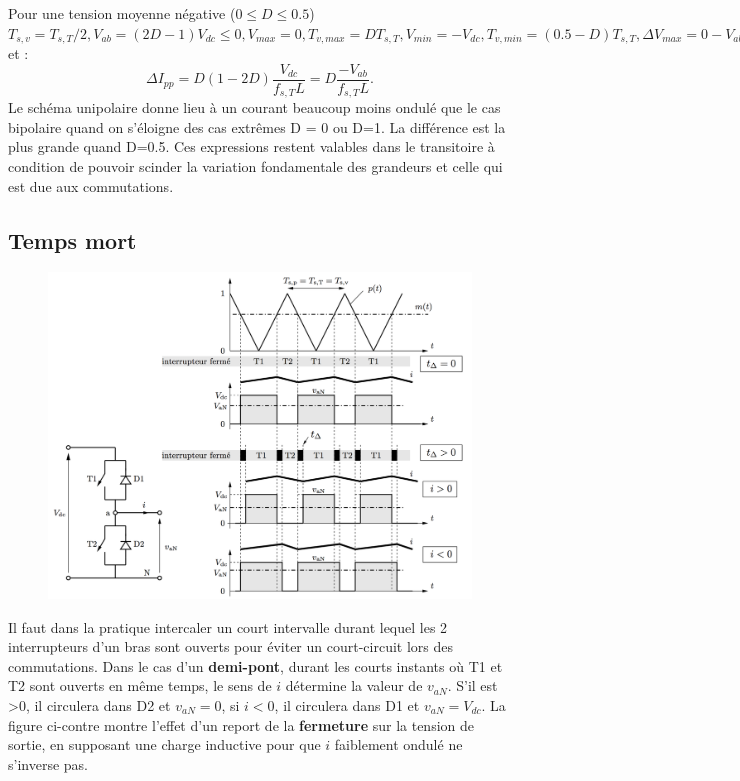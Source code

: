 		Pour une tension moyenne négative ($0\leq D\leq 0.5$) $T_{s,v} = T_{s,T}/2, V_{ab} =(2D-1)V_{dc}\leq 0, V_{max}=0, T_{v,max}=DT_{s,T}, V_{min}=-V_{dc}, T_{v,min}= (0.5-D)T_{s,T}, \Delta V_{max}= 0-V_{ab}=(1-2D)V_{dc}$ et :
		\begin{equation}
			\Delta I_{pp} = D(1-2D)\frac{V_{dc}}{f_{s,T}L} = D\frac{-V_{ab}}{f_{s,T}L}.
		\end{equation}
		Le schéma unipolaire donne lieu à un courant beaucoup moins ondulé que le cas bipolaire quand on s'éloigne des cas extrêmes D = 0 ou D=1. La différence est la plus grande quand D=0.5. Ces expressions restent valables dans le transitoire à condition de pouvoir scinder la variation fondamentale des grandeurs et celle qui est due aux commutations.
		
	\subsection{Temps mort}
		\begin{figure}
		\vspace{-5mm}
		\includegraphics[scale=0.2]{ch4/15}
		\end{figure}
		Il faut dans la pratique intercaler un court intervalle durant lequel les 2 interrupteurs d'un bras sont ouverts pour éviter un court-circuit lors des commutations. Dans le cas d'un \textbf{demi-pont}, durant les courts instants où T1 et T2 sont ouverts en même temps, le sens de $i$ détermine la valeur de $v_{aN}$. S'il est >0, il circulera dans D2 et $v_{aN} =0$, si $i<0$, il circulera dans D1 et $v_{aN} = V_{dc}$. La figure ci-contre montre l'effet d'un report de la \textbf{fermeture} sur la tension de sortie, en supposant une charge inductive pour que $i$ faiblement ondulé ne s'inverse pas. 
		
